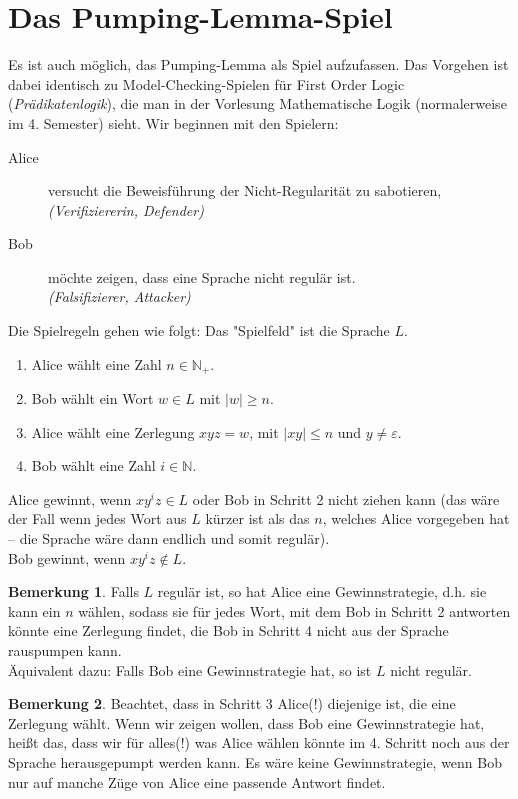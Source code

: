 \documentclass[11pt, a4paper]{article}
\theoremstyle{definition}
\newtheorem*{remark*}{Bemerkung}
\theoremstyle{plain}
\begin{document}
\section*{Das Pumping-Lemma-Spiel}
Es ist auch möglich, das Pumping-Lemma als Spiel aufzufassen. Das Vorgehen ist dabei identisch zu Model-Checking-Spielen für First Order Logic (\textit{Prädikatenlogik}), die man in der Vorlesung Mathematische Logik (normalerweise im 4. Semester) sieht. Wir beginnen mit den Spielern:
\begin{description}
	\item[Alice] versucht die Beweisführung der Nicht-Regularität zu sabotieren,\\
		\textit{(Verifiziererin, Defender)}
	\item[Bob] möchte zeigen, dass eine Sprache nicht regulär ist.\\
		\textit{(Falsifizierer, Attacker)}
\end{description}
Die Spielregeln gehen wie folgt: Das "Spielfeld" ist die Sprache $L$.
\begin{enumerate}[label=\arabic*)]
	\item Alice wählt eine Zahl $n \in \mathbb{N}_+$.
	\item Bob wählt ein Wort $w \in L$ mit $\left| w \right| \geq n$.
	\item Alice wählt eine Zerlegung $xyz = w$, mit $\left| xy \right| \leq n$ und $y \neq \varepsilon$.
	\item Bob wählt eine Zahl $i \in \mathbb{N}$.
\end{enumerate}
Alice gewinnt, wenn $xy^iz \in L$ oder Bob in Schritt 2 nicht ziehen kann (das wäre der Fall wenn jedes Wort aus $L$ kürzer ist als das $n$, welches Alice vorgegeben hat -- die Sprache wäre dann endlich und somit regulär).\\
Bob gewinnt, wenn $xy^iz \notin L$.

\begin{remark*}
	Falls $L$ regulär ist, so hat Alice eine Gewinnstrategie, d.h. sie kann ein $n$ wählen, sodass sie für jedes Wort, mit dem Bob in Schritt 2 antworten könnte eine Zerlegung findet, die Bob in Schritt 4 nicht aus der Sprache rauspumpen kann.\\
	Äquivalent dazu: Falls Bob eine Gewinnstrategie hat, so ist $L$ nicht regulär.
\end{remark*}
\begin{remark*}
	Beachtet, dass in Schritt 3 Alice(!) diejenige ist, die eine Zerlegung wählt. Wenn wir zeigen wollen, dass Bob eine Gewinnstrategie hat, heißt das, dass wir für alles(!) was Alice wählen könnte im 4. Schritt noch aus der Sprache herausgepumpt werden kann. Es wäre keine Gewinnstrategie, wenn Bob nur auf manche Züge von Alice eine passende Antwort findet.
\end{remark*}
\end{document}
